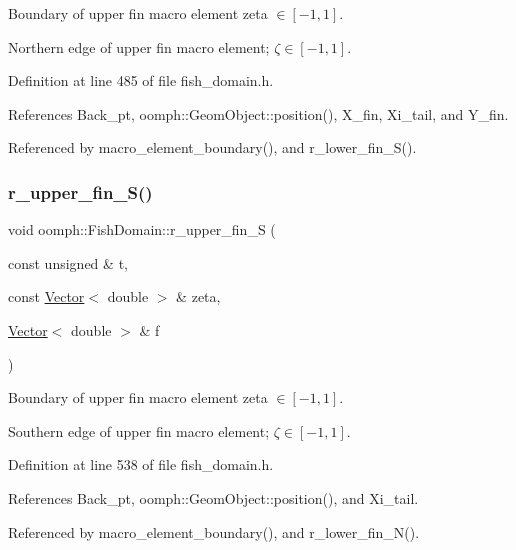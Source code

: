 Boundary of upper fin macro element zeta $ \in [-1,1] $. 

Northern edge of upper fin macro element; $ \zeta \in [-1,1] $. 

Definition at line 485 of file fish\+\_\+domain.\+h.



References Back\+\_\+pt, oomph\+::\+Geom\+Object\+::position(), X\+\_\+fin, Xi\+\_\+tail, and Y\+\_\+fin.



Referenced by macro\+\_\+element\+\_\+boundary(), and r\+\_\+lower\+\_\+fin\+\_\+\+S().

\mbox{\label{classoomph_1_1FishDomain_acd62f651648d85a79e04ced3193c3a2a}} 
\subsubsection{\texorpdfstring{r\+\_\+upper\+\_\+fin\+\_\+\+S()}{r\_upper\_fin\_S()}}
{\footnotesize\ttfamily void oomph\+::\+Fish\+Domain\+::r\+\_\+upper\+\_\+fin\+\_\+S (\begin{DoxyParamCaption}\item[{const unsigned \&}]{t,  }\item[{const \hyperlink{classoomph_1_1Vector}{Vector}$<$ double $>$ \&}]{zeta,  }\item[{\hyperlink{classoomph_1_1Vector}{Vector}$<$ double $>$ \&}]{f }\end{DoxyParamCaption})\hspace{0.3cm}{\ttfamily [private]}}



Boundary of upper fin macro element zeta $ \in [-1,1] $. 

Southern edge of upper fin macro element; $ \zeta \in [-1,1] $. 

Definition at line 538 of file fish\+\_\+domain.\+h.



References Back\+\_\+pt, oomph\+::\+Geom\+Object\+::position(), and Xi\+\_\+tail.



Referenced by macro\+\_\+element\+\_\+boundary(), and r\+\_\+lower\+\_\+fin\+\_\+\+N().

\mbox{\label{classoomph_1_1FishDomain_a750c0daa893d08038a52fbf20a4b23b8}} 
